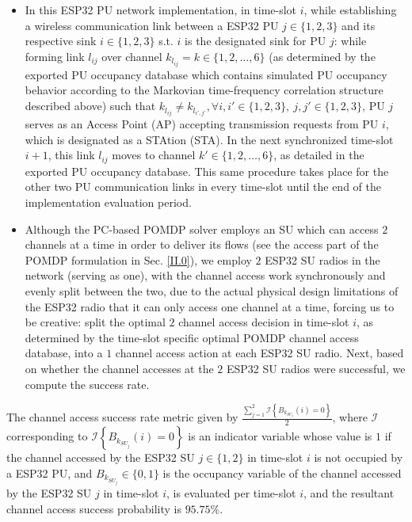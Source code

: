 \documentclass[10pt, twocolumn]{IEEEtran}
\begin{document}
\begin{itemize}
    \item In this ESP32 PU network implementation, in time-slot $i$, while establishing a wireless communication link between a ESP32 PU $j{\in}\{1,2,3\}$ and its respective sink $i{\in}\{1,2,3\}$ s.t. $i$ is the designated sink for PU $j$: while forming link $l_{ij}$ over channel $k_{l_{ij}}{=}k{\in}\{1,2,\dots,6\}$ (as determined by the exported PU occupancy database which contains simulated PU occupancy behavior according to the Markovian time-frequency correlation structure described above) such that $k_{l_{ij}}{\neq}k_{l_{i',j'}},{\forall}i,i'{\in}\{1,2,3\},\ j,j'{\in}\{1,2,3\}$, PU $j$ serves as an Access Point (AP) accepting transmission requests from PU $i$, which is designated as a STAtion (STA). In the next synchronized time-slot $i+1$, this link $l_{ij}$ moves to channel $k'{\in}\{1,2,\dots,6\}$, as detailed in the exported PU occupancy database. This same procedure takes place for the other two PU communication links in every time-slot until the end of the implementation evaluation period.
    \item Although the PC-based POMDP solver employs an SU which can access $2$ channels at a time in order to deliver its flows (see the access part of the POMDP formulation in Sec. \ref{II.0}), we employ $2$ ESP32 SU radios in the network (serving as one), with the channel access work synchronously and evenly split between the two, due to the actual physical design limitations of the ESP32 radio that it can only access one channel at a time, forcing us to be creative: split the optimal $2$ channel access decision in time-slot $i$, as determined by the time-slot specific optimal POMDP channel access database, into a $1$ channel access action at each ESP32 SU radio. Next, based on whether the channel accesses at the $2$ ESP32 SU radios were successful, we compute the success rate.
\end{itemize}
The channel access success rate metric given by $\frac{\sum_{j{=}1}^{2}\mathcal{I}\left\{B_{k_{SU_{j}}}(i){=}0\right\}}{2}$, where $\mathcal{I}$ corresponding to $\mathcal{I}\left\{B_{k_{SU_{j}}}(i)=0\right\}$ is an indicator variable whose value is $1$ if the channel accessed by the ESP32 SU $j{\in}\{1,2\}$ in time-slot $i$ is not occupied by a ESP32 PU, and $B_{k_{SU_{j}}}{\in}\{0,1\}$ is the occupancy variable of the channel accessed by the ESP32 SU $j$ in time-slot $i$, is evaluated per time-slot $i$, and the resultant channel access success probability is $95.75$\%.
\vspace{-4mm}
\end{document}
